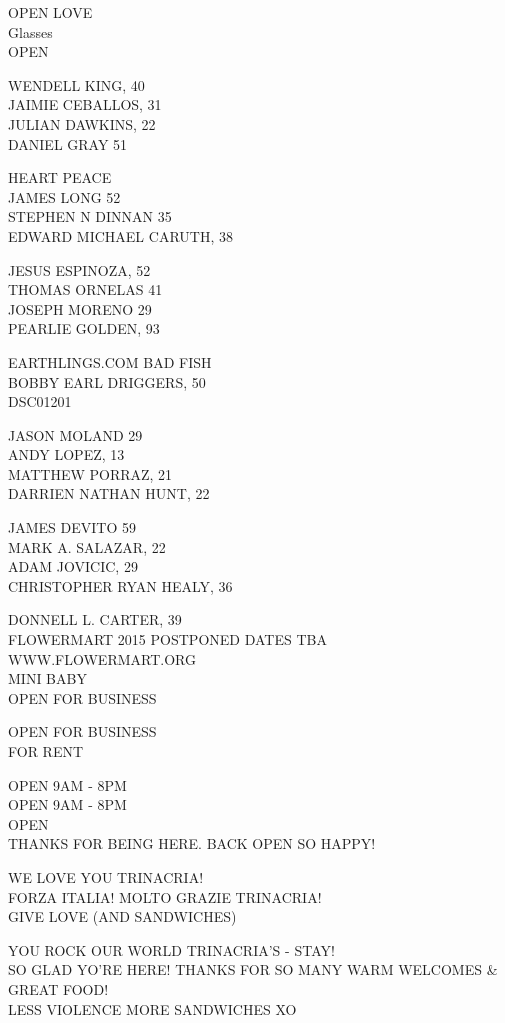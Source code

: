 \documentclass[10pt,letterpaper]{article}
\begin{document}
OPEN LOVE\\
Glasses\\
OPEN

WENDELL KING, 40\\
JAIMIE CEBALLOS, 31\\
JULIAN DAWKINS, 22\\
DANIEL GRAY 51

HEART PEACE\\
JAMES LONG 52\\
STEPHEN N DINNAN 35\\
EDWARD MICHAEL CARUTH, 38

JESUS ESPINOZA, 52\\
THOMAS ORNELAS 41\\
JOSEPH MORENO 29\\
PEARLIE GOLDEN, 93

EARTHLINGS.COM BAD FISH\\
BOBBY EARL DRIGGERS, 50\\
DSC01201

JASON MOLAND 29\\
ANDY LOPEZ, 13\\
MATTHEW PORRAZ, 21\\
DARRIEN NATHAN HUNT, 22

JAMES DEVITO 59\\
MARK A. SALAZAR, 22\\
ADAM JOVICIC, 29\\
CHRISTOPHER RYAN HEALY, 36

DONNELL L. CARTER, 39\\
FLOWERMART 2015 POSTPONED DATES TBA WWW.FLOWERMART.ORG\\
MINI BABY\\
OPEN FOR BUSINESS

OPEN FOR BUSINESS\\
FOR RENT

OPEN 9AM {-} 8PM\\
OPEN 9AM {-} 8PM\\
OPEN\\
THANKS FOR BEING HERE.  BACK OPEN SO HAPPY!

WE LOVE YOU TRINACRIA!\\
FORZA ITALIA!  MOLTO GRAZIE TRINACRIA!\\
GIVE LOVE (AND SANDWICHES)

YOU ROCK OUR WORLD TRINACRIA'S {-} STAY!\\
SO GLAD YO'RE HERE!  THANKS FOR SO MANY WARM WELCOMES \& GREAT FOOD!\\
LESS VIOLENCE MORE SANDWICHES XO
\end{document}
